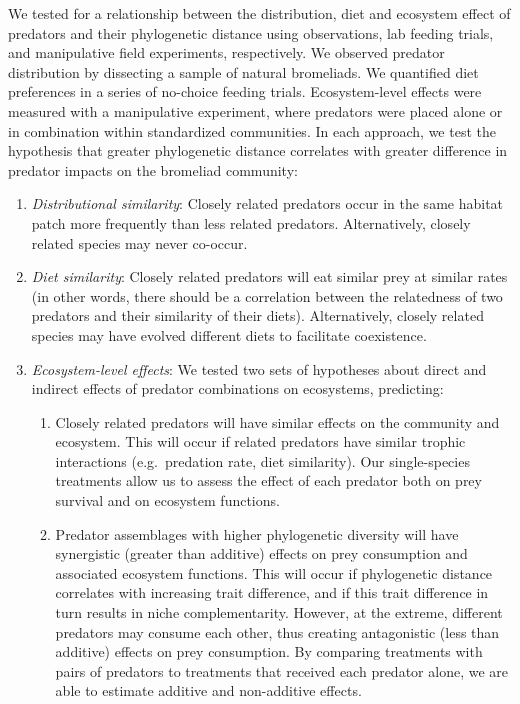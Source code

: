 \documentclass[11pt]{article}
\begin{document}
We tested for a relationship between the distribution, diet and
ecosystem effect of predators and their phylogenetic distance using
observations, lab feeding trials, and manipulative field experiments,
respectively. We observed predator distribution by dissecting a sample
of natural bromeliads. We quantified diet preferences in a series of
no-choice feeding trials. Ecosystem-level effects were measured with a
manipulative experiment, where predators were placed alone or in
combination within standardized communities. In each approach, we test
the hypothesis that greater phylogenetic distance correlates with
greater difference in predator impacts on the bromeliad community:

\begin{enumerate}
\def\labelenumi{\arabic{enumi}.}
\item
  \emph{Distributional similarity}: Closely related predators occur in
  the same habitat patch more frequently than less related predators.
  Alternatively, closely related species may never co-occur.
\item
  \emph{Diet similarity}: Closely related predators will eat similar
  prey at similar rates (in other words, there should be a correlation between the relatedness of two predators and their similarity of their diets). Alternatively, closely related species may have
  evolved different diets to facilitate coexistence.
\item
  \emph{Ecosystem-level effects}: We tested two sets of hypotheses about
  direct and indirect effects of predator combinations on ecosystems,
  predicting:

  \begin{enumerate}
  \def\labelenumii{(\alph{enumii})}
  \item
    Closely related predators will have similar effects on the
    community and ecosystem. This will occur if related predators have similar trophic
    interactions (e.g.~predation rate, diet similarity). Our
    single-species treatments allow us to assess the effect of each
    predator both on prey survival and on ecosystem functions.
  \item
    Predator assemblages with higher phylogenetic diversity will have
    synergistic (greater than additive) effects on prey consumption and
    associated ecosystem functions. This will occur if phylogenetic
    distance correlates with increasing trait difference, and if this
    trait difference in turn results in niche complementarity. However,
    at the extreme, different predators may consume each other, thus
    creating antagonistic (less than additive) effects on prey
    consumption. By comparing treatments with pairs of predators to
    treatments that received each predator alone, we are able to
    estimate additive and non-additive effects.
  \end{enumerate}
\end{enumerate}
\end{document}
